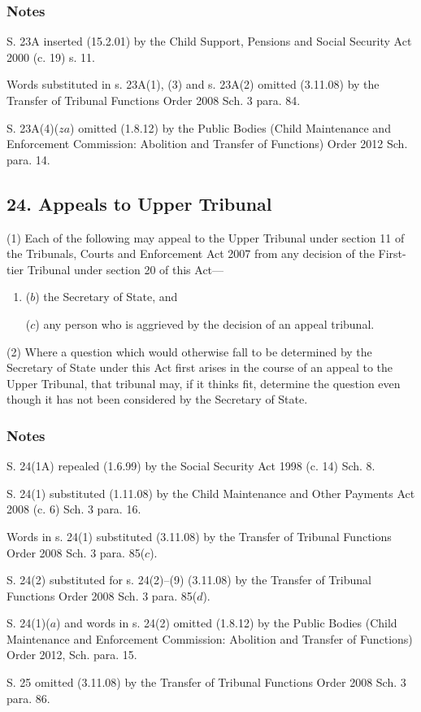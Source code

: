 \documentclass[a4paper]{article}
\newcommand\amendment[1]{\subsubsection*{Notes}{\itshape\frenchspacing\footnotesize #1 \par}}
\begin{document}
\amendment{

S. 23A inserted (15.2.01) by the Child Support, Pensions and Social Security Act
2000 (c. 19) s. 11.

Words substituted in s. 23A(1), (3) and s. 23A(2) omitted (3.11.08) by the Transfer of Tribunal Functions Order 2008 Sch. 3 para. 84.

S. 23A(4)($za$) omitted (1.8.12) by the Public Bodies (Child Maintenance and Enforcement Commission: Abolition and Transfer of Functions) Order 2012 Sch. para. 14.

}

\subsection{24. Appeals to Upper Tribunal}

(1) Each of the following may appeal to the Upper Tribunal under section
11 of the Tribunals, Courts and Enforcement Act 2007 from any decision of the First-tier Tribunal under section 20 of this Act---
\begin{enumerate}\item[]
($b$) the Secretary of State, and

($c$) any person who is aggrieved by the decision of an appeal tribunal.
\end{enumerate}

(2) Where a question which would otherwise fall to be determined by the Secretary of State under this Act first arises in the course of an
appeal to the Upper Tribunal, that tribunal may, if it thinks fit, determine the question even though it has not been considered by the Secretary of State.

\amendment{

S. 24(1A) repealed (1.6.99) by the Social Security Act 1998 (c. 14) Sch. 8. 

S. 24(1) substituted (1.11.08) by the Child Maintenance and Other
Payments Act 2008 (c. 6) Sch. 3 para. 16.

Words in s. 24(1) substituted (3.11.08) by the Transfer of Tribunal Functions Order 2008 Sch. 3 para. 85($c$). 

S. 24(2) substituted for s. 24(2)--(9) (3.11.08) by the Transfer of Tribunal Functions Order 2008 Sch. 3 para. 85($d$). 

S. 24(1)($a$) and words in s. 24(2) omitted (1.8.12) by the Public Bodies (Child Maintenance and Enforcement
Commission: Abolition and Transfer of Functions) Order 2012, Sch. para. 15. 

\medskip

S. 25 omitted (3.11.08) by the Transfer of Tribunal Functions Order 2008 Sch. 3 para. 86.

}
\end{document}

